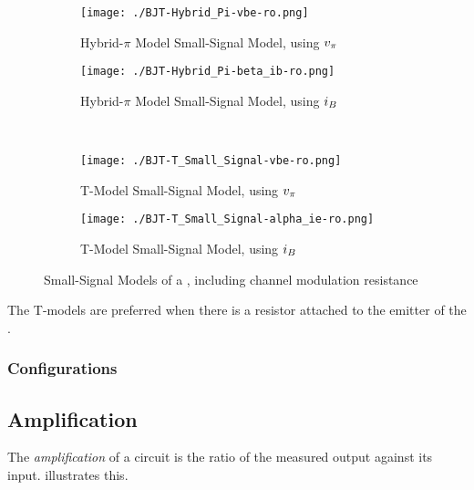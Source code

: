 \begin{figure}[h!tbp]
  \centering
  \begin{subfigure}{0.45\linewidth}
    \centering
    \texttt{[image: ./BJT-Hybrid\_Pi-vbe-ro.png]}
    \caption{Hybrid-$\pi$ Model Small-Signal Model, using $\ACVoltage{\pi}$ \parencite[p.~408]{sedraTextbook7}}
    \label{fig:BJT-Hybrid_Pi_Model-vbe-ro}
  \end{subfigure}
  \begin{subfigure}{0.45\linewidth}
    \centering
    \texttt{[image: ./BJT-Hybrid\_Pi-beta\_ib-ro.png]}
    \caption{Hybrid-$\pi$ Model Small-Signal Model, using $\ACCurrent{\Base}$ \parencite[p.~408]{sedraTextbook7}}
    \label{fig:BJT-Hybrid_Pi_Model-ib-ro}
  \end{subfigure}
  \\
  \begin{subfigure}{0.45\linewidth}
    \centering
    \texttt{[image: ./BJT-T\_Small\_Signal-vbe-ro.png]}
    \caption{T-Model Small-Signal Model, using $\ACVoltage{\pi}$ \parencite[p.~410]{sedraTextbook7}}
    \label{fig:BJT-T_Model-vpi-ro}
  \end{subfigure}
  \begin{subfigure}{0.45\linewidth}
    \centering
    \texttt{[image: ./BJT-T\_Small\_Signal-alpha\_ie-ro.png]}
    \caption{T-Model Small-Signal Model, using $\ACCurrent{\Base}$ \parencite[p.~410]{sedraTextbook7}}
    \label{fig:BJT-T_Model-ib-ro}
  \end{subfigure}
  \caption{Small-Signal Models of a , including channel modulation resistance}
  \label{fig:BJT-Small_Signal_Models-ro}
\end{figure}

\begin{remark*}
  The T-models are preferred when there is a resistor attached to the emitter of the .
\end{remark*}

\subsubsection{Configurations}\label{subsubsec:BJT_Configurations}

\subsection{Amplification}\label{subsec:Amplification}
The \emph{amplification} of a circuit is the ratio of the measured output against its input.
 illustrates this.

